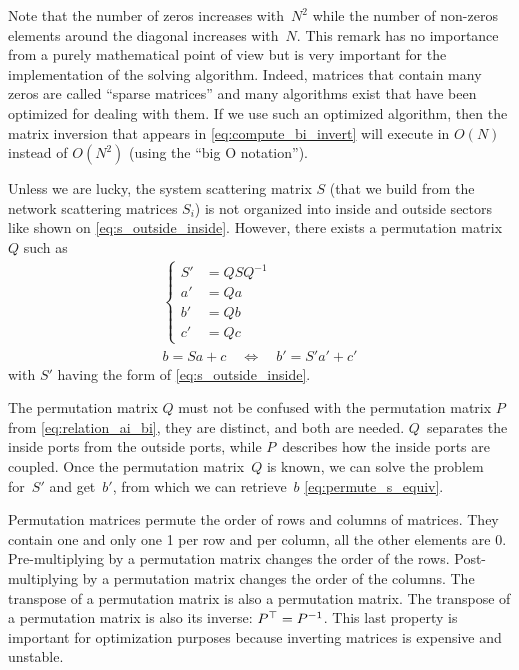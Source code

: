 Note that the number of zeros increases with~$N^2$ while the number of non-zeros elements around the diagonal increases with~$N$.
This remark has no importance from a purely mathematical point of view but is very important for the implementation of the solving algorithm.
Indeed, matrices that contain many zeros are called ``sparse matrices'' and many algorithms exist that have been optimized for dealing with them.
If we use such an optimized algorithm, then the matrix inversion that appears in \cref{eq:compute_bi_invert} will execute in $O(N)$ instead of $O(N^2)$ (using the ``big O notation'').

Unless we are lucky, the system scattering matrix $S$ (that we build from the network scattering matrices $S_i$) is not organized into inside and outside sectors like shown on \cref{eq:s_outside_inside}.
However, there exists a permutation matrix~$Q$ such as
\begin{gather}
    \left\lbrace
    \begin{aligned}
        S' &= Q S Q^{-1} \\
        a' &= Q a \\
        b' &= Q b \\
        c' &= Q c
    \end{aligned}
    \right.
    \label{eq:permute_s}
    \\
    b = S a + c\quad \Longleftrightarrow \quad b' = S' a' +c'\label{eq:permute_s_equiv}
\end{gather}
with $S'$ having the form of \cref{eq:s_outside_inside}.

The permutation matrix $Q$ must not be confused with the permutation matrix $P$ from \cref{eq:relation_ai_bi}, they are distinct, and both are needed.
$Q$~separates the inside ports from the outside ports, while $P$~describes how the inside ports are coupled.
Once the permutation matrix~$Q$ is known, we can solve the problem for~$S'$ and get~$b'$, from which we can retrieve~$b$ \cref{eq:permute_s_equiv}.

Permutation matrices permute the order of rows and columns of matrices.
They contain one and only one 1 per row and per column, all the other elements are 0.
Pre-multiplying by a permutation matrix changes the order of the rows.
Post-multiplying by a permutation matrix changes the order of the columns.
The transpose of a permutation matrix is also a permutation matrix.
The transpose of a permutation matrix is also its inverse: $P^\top = P^{-1}$.
This last property is important for optimization purposes because inverting matrices is expensive and unstable.

